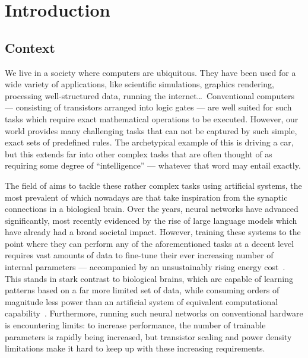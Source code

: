\chapter{Introduction}\label{ch:Introduction}

\section{Context}
We live in a society where computers are ubiquitous. %
They have been used for a wide variety of applications, like scientific simulations, graphics rendering, processing well-structured data, running the internet\dots\,
Conventional computers --- consisting of transistors arranged into logic gates --- are well suited for such tasks which require exact mathematical operations to be executed.
However, our world provides many challenging tasks that can not be captured by such simple, exact sets of predefined rules.
The archetypical example of this is driving a car, but this extends far into other complex tasks that are often thought of as requiring some degree of ``intelligence'' --- whatever that word may entail exactly. \par
The field of  aims to tackle these rather complex tasks using artificial systems, the most prevalent of which nowadays are  that take inspiration from the synaptic connections in a biological brain.
Over the years, neural networks have advanced significantly, most recently evidenced by the rise of large language models which have already had a broad societal impact. %
However, training these systems to the point where they can perform any of the aforementioned tasks at a decent level requires vast amounts of data to fine-tune their ever increasing number of internal parameters --- accompanied by an unsustainably rising energy cost~\cite{QuantumNeuromorphicOpportunities}.
This stands in stark contrast to biological brains, which are capable of learning patterns based on a far more limited set of data, while consuming orders of magnitude less power than an artificial system of equivalent computational capability~\cite{NeuromorphicSpintronics}.
Furthermore, running such neural networks on conventional hardware is encountering limits: to increase performance, the number of trainable parameters is rapidly being increased, but transistor scaling and power density limitations make it hard to keep up with these increasing requirements. %
